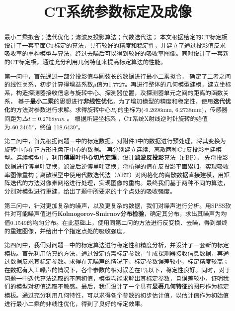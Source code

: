 \documentclass{myart}
\begin{document}
\renewcommand\figurename{图} %
\renewcommand\tablename{表} %

\title{CT系统参数标定及成像}
\date{}
\maketitle
\begin{abstract}{最小二乘拟合；迭代优化；滤波反投影算法；代数迭代法；}
本文根据给定的CT标定板设计了一套平面CT标定的算法，具有较好的精度和稳定性，并建立了通过投影值反求吸收率的重构模型与算法，经过去噪后可以得到较好的吸收率图像。同时设计了一套新的CT标定板，通过充分利用几何特征来提高标定算法的性能。

第一问中，首先通过一部分投影值与圆弦长的数据进行最小二乘拟合， 确定了二者之间的线性关系，初步计算得增益系数$\mu$值为1.7727。再进行整体的几何模型建模，建立坐标系，构造探测器接收信息与旋转中心、探测器位置，及探测器单元之间的距离的函数关系， 基于\textbf{最小二乘}的思想进行\textbf{非线性优化}，为了增加模型的精度和稳定性，使用\textbf{迭代优化}的方法对参数进行求解。求得旋转中心\(R_0\)的坐标为(-9.2696mm, 6.2738mm)，传感器间距为\(\Delta d = 0.2768mm\) 。 根据所建坐标系 ，CT系统X射线逆时针旋转的始值为-60.3465°，终值 118.6439°。

第二问中，首先根据问题一中的标定数据，对附件3中的数据进行预处理，将其变换为旋转中心在正方形托盘正中心的数据。 再分别建立连续、离散两种CT反投影重建模型。连续模型中，利用\textbf{傅里叶中心切片定理}，设计\textbf{滤波反投影}算法（FBP）， 先将投影数据进行傅里叶变换，滤波后逆傅里叶变换，将所得的值在反投影平面累加，实现吸收率图像重构；离散模型中使用代数迭代法（ART）对网格化的离散数据直接建模，用矩阵迭代的方法对像素网格进行处理，实现图像的重构。最终我们基于两种不同的算法，分别对模型进行重建，给出了题中所要求的十个点处的吸收强度。

第三问中，针对更加复杂的噪声，以及更复杂的数据，我们对噪声进行分析。用SPSS软件对可能噪声值进行\textbf{Kolmogorov-Smirnov分布检验}，确定其分布，求出其噪声为均值0.1549的均匀分布。在此基础上，使用同第二问的方法进行反变换、去噪，得到最终的重建图像，并给出十个指定点处的吸收强度。

第四问中，我们对问题一中的标定算法进行稳定性和精度分析，并设计了一套新的标定模板。首先利用仿真的方法，通过设定所需标定参数，生成探测器接收信息数据，再通过数据反求其标定参数。求得在无噪声的情况下，标定参数误差较小，标定精度较高；在数据有人工噪声的情况下，各个参数的相对误差在1\%以下，稳定性良好。同时，对于问题一中迭代算法选取的不同初值，模型均能求解出其标定参数，且误差较小，证明我们的模型对初值选取不敏感。最后，我们设计了一个具有\textbf{显著几何特征}的图形作为标定模板。通过充分利用几何特性，可以求得各个参数的初步估计值，以估计值作为初始值进行最小二乘的非线性优化，得到了良好的标定效果。%
\end{abstract}
\end{document}
